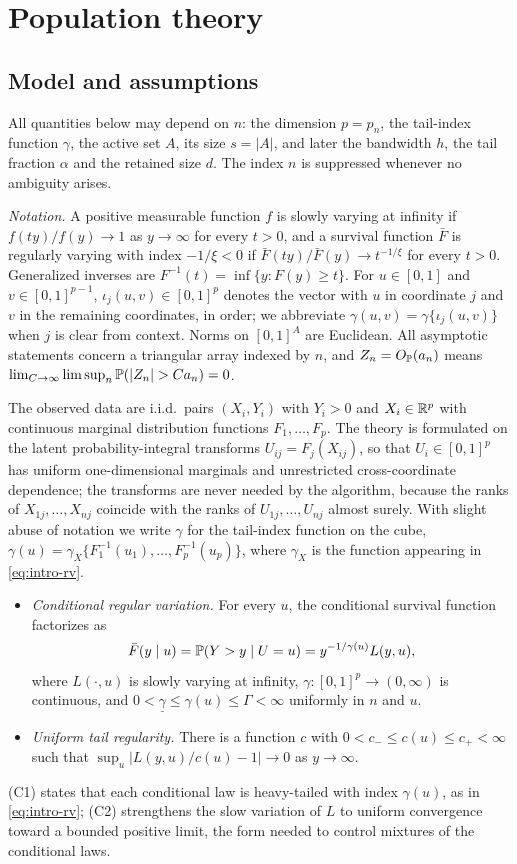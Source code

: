 \documentclass[bj,authoryear]{imsart}
\theoremstyle{plain}
\newcommand{\A}{A}\newcommand{\I}{I_\varepsilon}
\begin{document}
\section{Population theory}\label{sec:population}

\subsection{Model and assumptions}

All quantities below may depend on $n$: the dimension $p=p_n$, the
tail-index function $\gamma$, the active set $\A$, its size $s=|\A|$, and
later the bandwidth $h$, the tail fraction $\alpha$ and the retained size
$d$. The index $n$ is suppressed whenever no ambiguity arises.

\emph{Notation.} A positive measurable function $f$ is slowly varying
at infinity if $f(ty)/f(y)\to1$ as $y\to\infty$ for every $t>0$, and a
survival function $\bar F$ is regularly varying with index $-1/\xi<0$
if $\bar F(ty)/\bar F(y)\to t^{-1/\xi}$ for every $t>0$. Generalized
inverses are $F^{-1}(t)=\inf\{y:F(y)\ge t\}$. For $u\in[0,1]$ and
$v\in[0,1]^{p-1}$, $\iota_j(u,v)\in[0,1]^p$ denotes the vector with
$u$ in coordinate $j$ and $v$ in the remaining coordinates, in order;
we abbreviate $\gamma(u,v)=\gamma\{\iota_j(u,v)\}$ when $j$ is clear
from context. Norms on $[0,1]^{\A}$ are Euclidean. All asymptotic
statements concern a triangular array indexed by $n$, and
$Z_n=O_{\mathbb P}(a_n)$ means $\lim_{C\to\infty}\limsup_n
\Pp(|Z_n|>Ca_n)=0$.

The observed data are i.i.d.\ pairs $(X_i,Y_i)$ with $Y_i>0$ and
$X_i\in\mathbb R^p$ with continuous marginal distribution functions
$F_1,\ldots,F_p$. The theory is formulated on the latent
probability-integral transforms $U_{ij}=F_j(X_{ij})$, so that
$U_i\in[0,1]^p$ has uniform one-dimensional marginals and unrestricted
cross-coordinate dependence; the transforms are never needed by the
algorithm, because the ranks of $X_{1j},\ldots,X_{nj}$ coincide with the
ranks of $U_{1j},\ldots,U_{nj}$ almost surely. With slight abuse of
notation we write $\gamma$ for the tail-index function on the cube,
$\gamma(u)=\gamma_X\{F_1^{-1}(u_1),\ldots,F_p^{-1}(u_p)\}$, where
$\gamma_X$ is the function appearing in \eqref{eq:intro-rv}.

\begin{itemize}
\item[(C1)] \emph{Conditional regular variation.} For every $u$, the
conditional survival function factorizes as
\[
 \bar F(y\mid u)=\mathbb P(Y>y\mid U=u)=y^{-1/\gamma(u)}L(y,u),
\]
where $L(\cdot,u)$ is slowly varying at infinity,
$\gamma:[0,1]^{p}\to(0,\infty)$ is continuous, and
$0<\underline\gamma\le\gamma(u)\le\Gamma<\infty$ uniformly in $n$ and
$u$.
\item[(C2)] \emph{Uniform tail regularity.} There is a function $c$ with
$0<c_-\le c(u)\le c_+<\infty$ such that
$\sup_u|L(y,u)/c(u)-1|\to0$ as $y\to\infty$.
\end{itemize}
(C1) states that each conditional law is heavy-tailed with index
$\gamma(u)$, as in \eqref{eq:intro-rv}; (C2) strengthens the slow
variation of $L$ to uniform convergence toward a bounded positive limit,
the form needed to control mixtures of the conditional laws.
\end{document}

